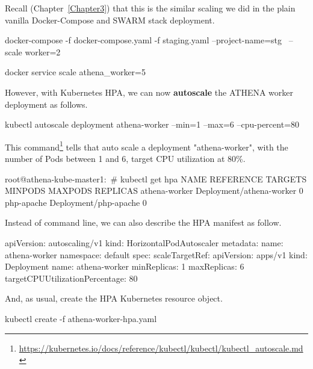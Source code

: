 \noindent Recall (Chapter~\ref{Chapter3}) that this is the similar scaling we did in the plain vanilla Docker-Compose and SWARM stack deployment.

\begin{small}
\begin{lcverbatim}
docker-compose -f docker-compose.yaml -f staging.yaml  --project-name=stg \
   --scale worker=2

docker service scale athena_worker=5   
\end{lcverbatim}
\end{small}

However, with Kubernetes HPA, we can now \textbf{autoscale} the ATHENA worker deployment as follows.
\begin{small}
\begin{lcverbatim}
kubectl autoscale deployment athena-worker --min=1 --max=6 --cpu-percent=80
\end{lcverbatim}
\end{small}

This command\footnote{\url{https://kubernetes.io/docs/reference/kubectl/kubectl/kubectl_autoscale.md}} tells that auto scale a deployment "athena-worker", with the number of Pods between 1 and 6, target CPU utilization at 80\%.

\begin{small}
\begin{lcverbatim}
root@athena-kube-master1:~# kubectl get hpa
NAME            REFERENCE                  TARGETS   MINPODS   MAXPODS   REPLICAS
athena-worker   Deployment/athena-worker   0%
php-apache      Deployment/php-apache      0%
\end{lcverbatim}
\end{small}


\noindent Instead of command line, we can also describe the HPA manifest as follow.
\begin{small}
\begin{lcverbatim}
apiVersion: autoscaling/v1
kind: HorizontalPodAutoscaler
metadata:
  name: athena-worker
  namespace: default
spec:
  scaleTargetRef:
    apiVersion: apps/v1
    kind: Deployment
    name: athena-worker
  minReplicas: 1
  maxReplicas: 6
  targetCPUUtilizationPercentage: 80
\end{lcverbatim}
\end{small}

\noindent And, as usual, create the HPA Kubernetes resource object.
\begin{small}
\begin{lcverbatim}
kubectl create -f athena-worker-hpa.yaml
\end{lcverbatim}
\end{small}

